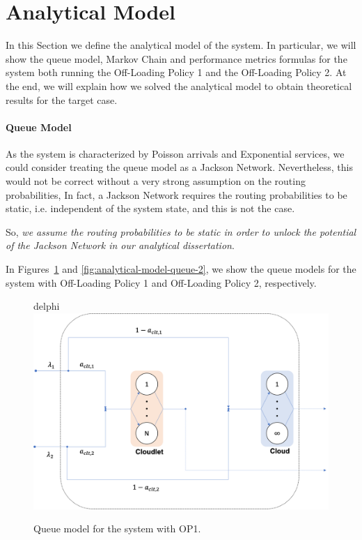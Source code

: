\section{Analytical Model}
\label{sec:analytical-model}
In this Section we define the analytical model of the system.
%
In particular, we will show the queue model, Markov Chain and performance metrics formulas for the system both running the Off-Loading Policy 1 and the Off-Loading Policy 2.
%
At the end, we will explain how we solved the analytical model to obtain theoretical results for the target case.

\paragraph{Queue Model}
As the system is characterized by Poisson arrivals and Exponential services, we could consider treating the queue model as a Jackson Network. 
Nevertheless, this would not be correct without a very strong assumption on the routing probabilities, In fact, a Jackson Network requires the routing probabilities  to be static, i.e. independent of the system state, and this is not the case.

So, \textit{we assume the routing probabilities to be static in order to unlock the potential of the Jackson Network in our analytical dissertation}.

In Figures~\ref{fig:analytical-model-queue-1} and \ref{fig:analytical-model-queue-2}, we show the queue models for the system with Off-Loading Policy 1 and Off-Loading Policy 2, respectively.

\begin{figure}delphi
	\includegraphics[width=\columnwidth]{fig/analytical-model-queue-1}
	\caption{Queue model for the system with OP1.}
	\label{fig:analytical-model-queue-1}
\end{figure}

